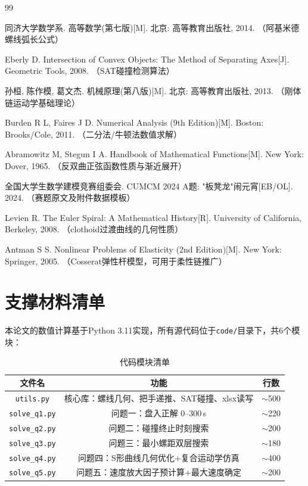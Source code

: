 \documentclass[12pt]{ctexart}
\begin{document}
\FloatBarrier

{}
\begin{thebibliography}{99}

 同济大学数学系. 高等数学(第七版)[M]. 北京: 高等教育出版社, 2014. （阿基米德螺线弧长公式）

 Eberly D. Intersection of Convex Objects: The Method of Separating Axes[J]. Geometric Tools, 2008. （SAT碰撞检测算法）

 孙桓, 陈作模, 葛文杰. 机械原理(第八版)[M]. 北京: 高等教育出版社, 2013. （刚体链运动学基础理论）

 Burden R L, Faires J D. Numerical Analysis (9th Edition)[M]. Boston: Brooks/Cole, 2011. （二分法/牛顿法数值求解）

 Abramowitz M, Stegun I A. Handbook of Mathematical Functions[M]. New York: Dover, 1965. （反双曲正弦函数性质与渐近展开）

 全国大学生数学建模竞赛组委会. CUMCM 2024 A题: "板凳龙"闹元宵[EB/OL]. 2024. （赛题原文及附件数据模板）

 Levien R. The Euler Spiral: A Mathematical History[R]. University of California, Berkeley, 2008. （clothoid过渡曲线的几何性质）

 Antman S S. Nonlinear Problems of Elasticity (2nd Edition)[M]. New York: Springer, 2005. （Cosserat弹性杆模型，可用于柔性链推广）

\end{thebibliography}

\appendix
\section{支撑材料清单}

本论文的数值计算基于Python 3.11实现，所有源代码位于\texttt{code/}目录下，共6个模块：

\begin{table}[H]
\centering
\caption{代码模块清单}
\begin{tabular}{ccc}
\toprule
文件名 & 功能 & 行数 \\
\midrule
\texttt{utils.py} & 核心库：螺线几何、把手递推、SAT碰撞、xlsx读写 & $\sim$500 \\
\texttt{solve\_q1.py} & 问题一：盘入正解 0--300\,s & $\sim$220 \\
\texttt{solve\_q2.py} & 问题二：碰撞终止时刻搜索 & $\sim$200 \\
\texttt{solve\_q3.py} & 问题三：最小螺距双层搜索 & $\sim$180 \\
\texttt{solve\_q4.py} & 问题四：S形曲线几何优化+复合运动学仿真 & $\sim$400 \\
\texttt{solve\_q5.py} & 问题五：速度放大因子预计算+最大速度确定 & $\sim$200 \\
\bottomrule
\end{tabular}
\end{table}
\end{document}
